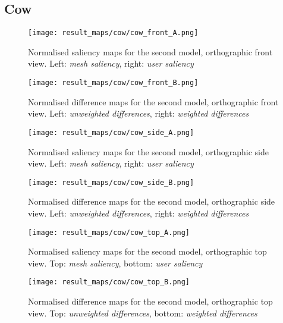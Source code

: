 \FloatBarrier
		\subsection{Cow}
		\label{sec:results_cow}
%
%
\begin{figure}[!htb]
	\centering
	\texttt{[image: result\_maps/cow/cow\_front\_A.png]}\\ %
	\caption{Normalised saliency maps for the second model, orthographic front view. Left: \textit{mesh saliency}, right: \textit{user saliency}}
	\label{fig:results_cow_front_a}
\end{figure}
\begin{figure}[!htb]
	\centering
	\texttt{[image: result\_maps/cow/cow\_front\_B.png]}\\ %
	\caption{Normalised difference maps for the second model, orthographic front view. Left: \textit{unweighted differences}, right: \textit{weighted differences}}
	\label{fig:results_cow_front_b}
\end{figure}

\begin{figure}[!htb]
	\centering
	\texttt{[image: result\_maps/cow/cow\_side\_A.png]}\\ %
	\caption{Normalised saliency maps for the second model, orthographic side view. Left: \textit{mesh saliency}, right: \textit{user saliency}}
	\label{fig:results_cow_side_a}
\end{figure}
\begin{figure}[!htb]
	\centering
	\texttt{[image: result\_maps/cow/cow\_side\_B.png]}\\ %
	\caption{Normalised difference maps for the second model, orthographic side view. Left: \textit{unweighted differences}, right: \textit{weighted differences}}
	\label{fig:results_cow_side_b}
\end{figure}

\begin{figure}[!htb]
	\centering
	\texttt{[image: result\_maps/cow/cow\_top\_A.png]}\\ %
	\caption{Normalised saliency maps for the second model, orthographic top view. Top: \textit{mesh saliency}, bottom: \textit{user saliency}}
	\label{fig:results_cow_top_a}
\end{figure}
\begin{figure}[!htb]
	\centering
	\texttt{[image: result\_maps/cow/cow\_top\_B.png]}\\ %
	\caption{Normalised difference maps for the second model, orthographic top view. Top: \textit{unweighted differences}, bottom: \textit{weighted differences}}
	\label{fig:results_cow_top_b}
\end{figure}

